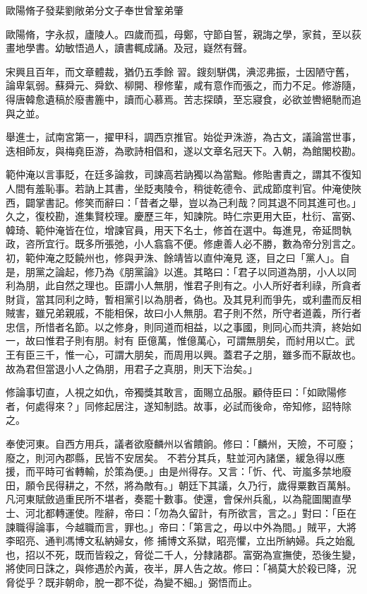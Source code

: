 
\begin{pinyinscope}

 歐陽脩子發棐劉敞弟分文子奉世曾鞏弟肇



 歐陽脩，字永叔，廬陵人。四歲而孤，母鄭，守節自誓，親誨之學，家貧，至以荻畫地學書。幼敏悟過人，讀書輒成誦。及冠，嶷然有聲。



 宋興且百年，而文章體裁，猶仍五季餘
 習。鎪刻駢偶，淟涊弗振，士因陋守舊，論卑氣弱。蘇舜元、舜欽、柳開、穆修輩，咸有意作而張之，而力不足。修游隨，得唐韓愈遺稿於廢書簏中，讀而心慕焉。苦志探賾，至忘寢食，必欲並轡絕馳而追與之並。



 舉進士，試南宮第一，擢甲科，調西京推官。始從尹洙游，為古文，議論當世事，迭相師友，與梅堯臣游，為歌詩相倡和，遂以文章名冠天下。入朝，為館閣校勘。



 範仲淹以言事貶，在廷多論救，司諫高若訥獨以為當黜。修貽書責之，謂其不復知
 人間有羞恥事。若訥上其書，坐貶夷陵令，稍徙乾德令、武成節度判官。仲淹使陜西，闢掌書記。修笑而辭曰：「昔者之舉，豈以為己利哉？同其退不同其進可也。」久之，復校勘，進集賢校理。慶歷三年，知諫院。時仁宗更用大臣，杜衍、富弼、韓琦、範仲淹皆在位，增諫官員，用天下名士，修首在選中。每進見，帝延問執政，咨所宜行。既多所張弛，小人翕翕不便。修慮善人必不勝，數為帝分別言之。初，範仲淹之貶饒州也，修與尹洙、餘靖皆以直仲淹見
 逐，目之曰「黨人」。自是，朋黨之論起，修乃為《朋黨論》以進。其略曰：「君子以同道為朋，小人以同利為朋，此自然之理也。臣謂小人無朋，惟君子則有之。小人所好者利祿，所貪者財貨，當其同利之時，暫相黨引以為朋者，偽也。及其見利而爭先，或利盡而反相賊害，雖兄弟親戚，不能相保，故曰小人無朋。君子則不然，所守者道義，所行者忠信，所惜者名節。以之修身，則同道而相益，以之事國，則同心而共濟，終始如一，故曰惟君子則有朋。紂有
 臣億萬，惟億萬心，可謂無朋矣，而紂用以亡。武王有臣三千，惟一心，可謂大朋矣，而周用以興。蓋君子之朋，雖多而不厭故也。故為君但當退小人之偽朋，用君子之真朋，則天下治矣。」



 修論事切直，人視之如仇，帝獨獎其敢言，面賜立品服。顧侍臣曰：「如歐陽修者，何處得來？」同修起居注，遂知制誥。故事，必試而後命，帝知修，詔特除之。



 奉使河東。自西方用兵，議者欲廢麟州以省饋餉。修曰：「麟州，天險，不可廢；廢之，則河內郡縣，民皆不安居矣。
 不若分其兵，駐並河內諸堡，緩急得以應援，而平時可省轉輸，於策為便。」由是州得存。又言：「忻、代、岢嵐多禁地廢田，願令民得耕之，不然，將為敵有。」朝廷下其議，久乃行，歲得粟數百萬斛。凡河東賦斂過重民所不堪者，奏罷十數事。使還，會保州兵亂，以為龍圖閣直學士、河北都轉運使。陛辭，帝曰：「勿為久留計，有所欲言，言之。」對曰：「臣在諫職得論事，今越職而言，罪也。」帝曰：「第言之，毋以中外為間。」賊平，大將李昭亮、通判馮博文私納婦女，修
 捕博文系獄，昭亮懼，立出所納婦。兵之始亂也，招以不死，既而皆殺之，脅從二千人，分隸諸郡。富弼為宣撫使，恐後生變，將使同日誅之，與修遇於內黃，夜半，屏人告之故。修曰：「禍莫大於殺已降，況脅從乎？既非朝命，脫一郡不從，為變不細。」弼悟而止。




\end{pinyinscope}
